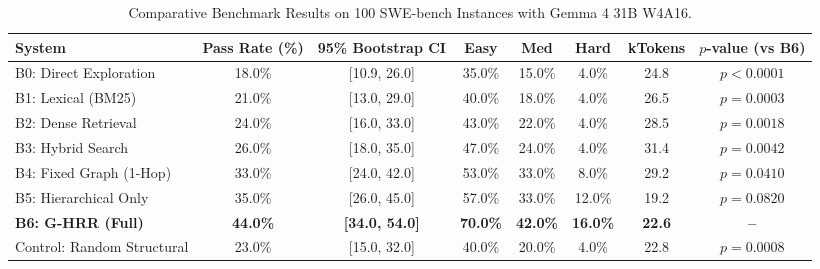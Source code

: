 \documentclass[10pt,twocolumn,letterpaper]{article}
\begin{document}
\begin{table}[t]
\centering
\small
\caption{Comparative Benchmark Results on 100 SWE-bench Instances with Gemma 4 31B W4A16.}
\label{tab:main_results}
\begin{tabular}{lccccccc}
\toprule
\textbf{System} & \textbf{Pass Rate (\%)} & \textbf{95\% Bootstrap CI} & \textbf{Easy} & \textbf{Med} & \textbf{Hard} & \textbf{kTokens} & \textbf{$p$-value (vs B6)} \\
\midrule
B0: Direct Exploration & 18.0\% & [10.9, 26.0] & 35.0\% & 15.0\% & 4.0\% & 24.8 & $p < 0.0001$ \\
B1: Lexical (BM25) & 21.0\% & [13.0, 29.0] & 40.0\% & 18.0\% & 4.0\% & 26.5 & $p = 0.0003$ \\
B2: Dense Retrieval & 24.0\% & [16.0, 33.0] & 43.0\% & 22.0\% & 4.0\% & 28.5 & $p = 0.0018$ \\
B3: Hybrid Search & 26.0\% & [18.0, 35.0] & 47.0\% & 24.0\% & 4.0\% & 31.4 & $p = 0.0042$ \\
B4: Fixed Graph (1-Hop) & 33.0\% & [24.0, 42.0] & 53.0\% & 33.0\% & 8.0\% & 29.2 & $p = 0.0410$ \\
B5: Hierarchical Only & 35.0\% & [26.0, 45.0] & 57.0\% & 33.0\% & 12.0\% & 19.2 & $p = 0.0820$ \\
\textbf{B6: G-HRR (Full)} & \textbf{44.0\%} & \textbf{[34.0, 54.0]} & \textbf{70.0\%} & \textbf{42.0\%} & \textbf{16.0\%} & \textbf{22.6} & \textbf{--} \\
\midrule
Control: Random Structural & 23.0\% & [15.0, 32.0] & 40.0\% & 20.0\% & 4.0\% & 22.8 & $p = 0.0008$ \\
\bottomrule
\end{tabular}
\end{table}
\end{document}
